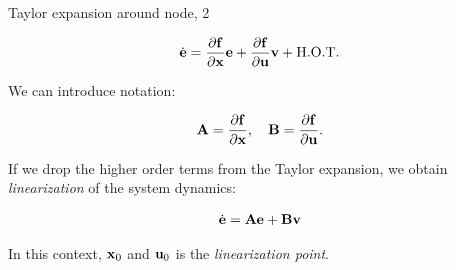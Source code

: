 \documentclass{beamer}
\begin{document}
\begin{frame}{Taylor expansion around node, 2}
	\begin{flushleft}
		
		\textcolor{mygray}{
		\begin{align}
			\dot{\mathbf{e}} = \frac{\partial \mathbf{f}}{\partial \mathbf{x}} \mathbf{e} + 
			\frac{\partial \mathbf{f}}{\partial \mathbf{u}} \mathbf{v} + \text{H.O.T.}
		\end{align}		}
	
		We can introduce notation:
		
		\begin{align}
			\mathbf{A} = \frac{\partial \mathbf{f}}{\partial \mathbf{x}},  \ \ \
			\mathbf{B} = \frac{\partial \mathbf{f}}{\partial \mathbf{u}}.
		\end{align}
		
		If we drop the higher order terms from the Taylor expansion, we obtain \emph{linearization} of the system dynamics:
		
		\begin{align}
			\dot{\mathbf{e}} = \mathbf{A} \mathbf{e} + \mathbf{B} \mathbf{v}
		\end{align}	
	
		In this context, $\mathbf{x}_0$ and $\mathbf{u}_0$ is the \emph{linearization point}.
		
	\end{flushleft}
\end{frame}
\end{document}
